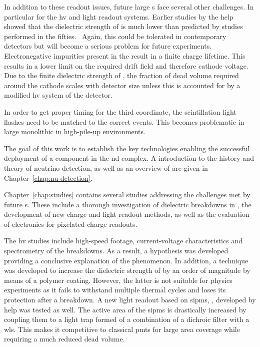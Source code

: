In addition to these readout issues, future large \lartpc{}s face several other challenges.
In particular for the \gls{hv} and light readout systems.
Earlier studies by the \gls{help} showed that the dielectric strength of \lar{} is much lower than predicted by studies performed in the fifties.~\cite{breakdown_14, swan1, swan2}
Again, this could be tolerated in contemporary detectors but will become a serious problem for future experiments.
Electronegative impurities present in the \lar{} result in a finite charge lifetime.
This results in a lower limit on the required drift field and therefore cathode voltage.
Due to the finite dielectric strength of \lar{}, the fraction of dead volume required around the cathode scales with detector size unless this is accounted for by a modified \gls{hv} system of the detector.

In order to get proper timing for the third coordinate, the scintillation light flashes need to be matched to the correct events.
This becomes problematic in large monolithic \lartpc{} in high-pile-up environments.

The goal of this work is to establish the key technologies enabling the successful deployment of a \lartpc{} component in the \dune{} \gls{nd} complex.
A introduction to the history and theory of neutrino detection, as well as an overview of \dune{} are given in Chapter~\ref{chap:nu-detection}.

Chapter~\ref{chap:studies} contains several studies addressing the challenges met by future \lartpc{}s.
These include a thorough investigation of dielectric breakdowns in \lar{}, the development of new charge and light readout methods, as well as the evaluation of electronics for pixelated charge readouts.

The \gls{hv} studies include high-speed footage, current-voltage characteristics and spectrometry of the breakdowns.
As a result, a hypothesis was developed providing a conclusive explanation of the phenomenon.
In addition, a technique was developed to increase the dielectric strength of \lar{} by an order of magnitude by means of a polymer coating.
However, the latter is not suitable for physics experiments as it fails to withstand multiple thermal cycles and loses its protection after a breakdown.
A new light readout based on \glspl{sipm}, \AL{}, developed by \gls{help} was tested as well.
The active area of the \glspl{sipm} is drastically increased by coupling them to a light trap formed of a combination of a dichroic filter with a \gls{wls}.
This makes it competitive to classical \glspl{pmt} for large area coverage while requiring a much reduced dead volume.

